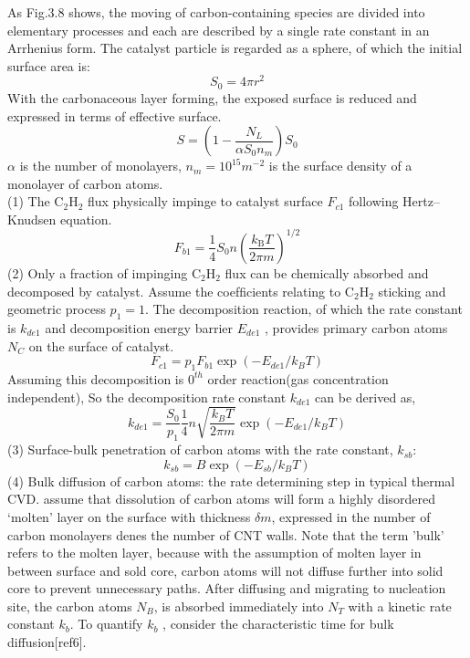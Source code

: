 As Fig.3.8 shows, the moving of carbon-containing species are divided into elementary processes and each are described by a single rate constant in an Arrhenius form.
The catalyst particle is regarded as a sphere, of which the initial surface area is:
\begin{equation}
S_{0}=4 \pi r^{2}
\end{equation}
With the carbonaceous layer forming, the exposed surface is reduced and expressed in terms of eﬀective surface. 
\begin{equation}
S=\left(1-\frac{N_{L}}{\alpha S_{0} n_{m}}\right)S_{0}
\end{equation}
$\alpha $ is the number of monolayers, $n_{m}={10}^{15} m^{-2}$ is the surface density of a monolayer of carbon atoms.
\\
(1) The $\mathrm{C_{2}H_{2}}$  flux physically impinge to catalyst surface $F_{c1}$ following Hertz–Knudsen equation. 
\begin{equation}
F_{b 1}=\frac{1}{4} S_{0} n\left(\frac{k_{\mathrm{B}} T}{2 \pi m}\right)^{1 / 2}
\tag{3.2.1}
\end{equation}
(2) Only a fraction of impinging $\mathrm{C_{2}H_{2}}$ flux can be chemically absorbed and decomposed by catalyst. Assume the coefﬁcients relating to $\mathrm{C_{2}H_{2}}$ sticking and geometric process $p_{1}=1$.  The decomposition reaction, of which the rate constant is $k_{de1}$ and decomposition energy barrier $E_{de1}$ , provides primary carbon atoms $N_{C}$ on the surface of catalyst.
\begin{equation}
F_{c 1}=p_{1}F_{b1}\exp \left(-E_{d e 1} / k_{B} T\right)
\tag{3.2.2}
\end{equation}
Assuming this decomposition is $0^{th}$ order reaction(gas concentration independent), So the decomposition rate constant $k_{de1}$ can be derived as,
\begin{equation}
k_{d e 1}=\frac{S_{0}}{p_{1}} \frac{1}{4} n \sqrt{\frac{k_{B} T}{2 \pi m}} \exp \left(-E_{d e 1} / k_{B} T\right)
\tag{3.2.3}
\end{equation}
(3) Surface-bulk penetration of carbon atoms with the rate constant, $k_{sb}$:
\begin{equation}
k_{s b}=B \exp \left(-E_{s b} / k_{B} T\right)
\tag{3.2.4}
\end{equation}
(4) Bulk diﬀusion of carbon atoms: the rate determining step in typical thermal CVD. assume that dissolution of carbon atoms will form a highly disordered ‘molten’ layer on the surface with thickness $\delta m$, expressed in the number of carbon monolayers denes the number of CNT walls. Note that the term ’bulk’ refers to the molten layer, because with the assumption of molten layer in between surface and sold core, carbon atoms will not diﬀuse further into solid core to prevent unnecessary paths. After diﬀusing and migrating to nucleation site, the carbon atoms $N_{B}$, is absorbed immediately into $N_{T}$ with a kinetic rate constant $k_{b}$. To quantify $k_{b}$ , consider the characteristic time for bulk diﬀusion[ref6].
